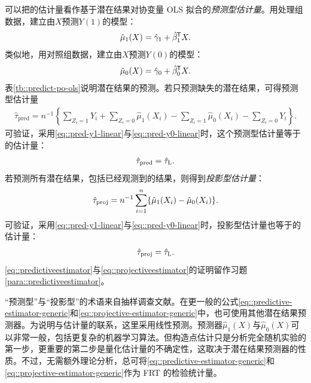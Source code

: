 
可以把\citet{lin2013}的估计量看作基于潜在结果对协变量 OLS 拟合的{\it 预测型估计量}。用处理组数据，建立由$X$预测$Y(1)$的模型：
\begin{eqnarray}
\label{eq::pred-y1-linear}
\hat{\mu}_1(X) = \hat{\gamma}_1 + \hat{\beta}_1^{\mkern-1.5mu\mathsf{T}} X.
\end{eqnarray}
类似地，用对照组数据，建立由$X$预测$Y(0)$的模型：
\begin{eqnarray}
\label{eq::pred-y0-linear}
\hat{\mu}_0(X)= \hat{\gamma}_0 + \hat{\beta}_0^{\mkern-1.5mu\mathsf{T}} X . 
\end{eqnarray}
表\ref{tb::predict-po-ols}说明潜在结果的预测。若只预测缺失的潜在结果，可得预测型估计量
\begin{eqnarray}\label{eq::predictive-estimator-generic}
\hat{\tau}_\text{pred} = n^{-1} \left\{   \sum_{Z_i=1}Y_i + \sum_{Z_i=0}\hat{\mu}_1(X_i) - \sum_{Z_i=1} \hat{\mu}_0(X_i) - \sum_{Z_i=0} Y_i     \right\} .
\end{eqnarray}
可验证，采用\eqref{eq::pred-y1-linear}与\eqref{eq::pred-y0-linear}时，这个预测型估计量等于\citet{lin2013}的估计量：
\begin{eqnarray}
\label{eq::predictiveestimator}
\hat{\tau}_\text{pred} = \hat{\tau}_\textsc{L}.
\end{eqnarray}
若预测所有潜在结果，包括已经观测到的结果，则得到{\it 投影型估计量}：
\begin{eqnarray}\label{eq::projective-estimator-generic}
\hat{\tau}_\text{proj} = n^{-1}  \sum_{i=1}^n \{ \hat{\mu}_1(X_i) - \hat{\mu}_0(X_i)    \}.
\end{eqnarray}
可验证，采用\eqref{eq::pred-y1-linear}与\eqref{eq::pred-y0-linear}时，投影型估计量也等于\citet{lin2013}的估计量：
\begin{eqnarray}
\label{eq::projectiveestimator}
\hat{\tau}_\text{proj} = \hat{\tau}_\textsc{L}.
\end{eqnarray}
\eqref{eq::predictiveestimator}与\eqref{eq::projectiveestimator}的证明留作习题\ref{para::predictiveestimator}。 


“预测型”与“投影型”的术语来自抽样调查文献\citep{firth1998robust, ding2018causal}。在更一般的公式\eqref{eq::predictive-estimator-generic}和\eqref{eq::projective-estimator-generic}中，也可使用其他潜在结果预测器。为说明与\citet{lin2013}估计量的联系，这里采用线性预测。预测器$\hat{\mu}_1(X)$与$\hat{\mu}_0(X)$可以非常一般，包括更复杂的机器学习算法。但构造点估计只是分析完全随机实验的第一步，更重要的第二步是量化估计量的不确定性，这取决于潜在结果预测器的性质。不过，无需额外理论分析，总可将\eqref{eq::predictive-estimator-generic}和\eqref{eq::projective-estimator-generic}作为 FRT 的检验统计量。 
 
